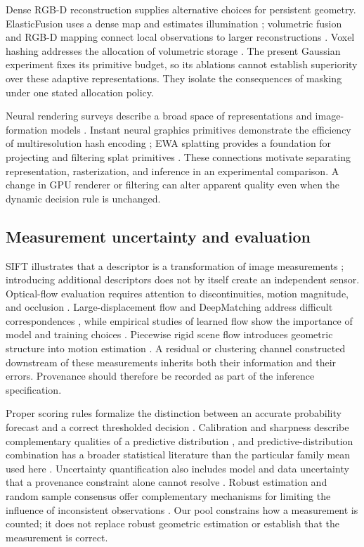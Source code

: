 \documentclass[10pt,conference]{IEEEtran}
\begin{document}
Dense RGB-D reconstruction supplies alternative choices for persistent geometry. ElasticFusion uses a dense map and estimates illumination \cite{elastic2016}; volumetric fusion and RGB-D mapping connect local observations to larger reconstructions \cite{dense2018,rgbd2013}. Voxel hashing addresses the allocation of volumetric storage \cite{sdf2013}. The present Gaussian experiment fixes its primitive budget, so its ablations cannot establish superiority over these adaptive representations. They isolate the consequences of masking under one stated allocation policy.

Neural rendering surveys describe a broad space of representations and image-formation models \cite{nerfsurvey2022,neuralrender2022}. Instant neural graphics primitives demonstrate the efficiency of multiresolution hash encoding \cite{instant2022}; EWA splatting provides a foundation for projecting and filtering splat primitives \cite{ewasplat2002}. These connections motivate separating representation, rasterization, and inference in an experimental comparison. A change in GPU renderer or filtering can alter apparent quality even when the dynamic decision rule is unchanged.

\subsection{Measurement uncertainty and evaluation}
SIFT illustrates that a descriptor is a transformation of image measurements \cite{sift2004}; introducing additional descriptors does not by itself create an independent sensor. Optical-flow evaluation requires attention to discontinuities, motion magnitude, and occlusion \cite{flow2014}. Large-displacement flow and DeepMatching address difficult correspondences \cite{flow2010,deepflow2015}, while empirical studies of learned flow show the importance of model and training choices \cite{pwc2020}. Piecewise rigid scene flow introduces geometric structure into motion estimation \cite{sceneflow2019}. A residual or clustering channel constructed downstream of these measurements inherits both their information and their errors. Provenance should therefore be recorded as part of the inference specification.

Proper scoring rules formalize the distinction between an accurate probability forecast and a correct thresholded decision \cite{proper2007journal}. Calibration and sharpness describe complementary qualities of a predictive distribution \cite{forecast2007journal}, and predictive-distribution combination has a broader statistical literature than the particular family mean used here \cite{pool2013}. Uncertainty quantification also includes model and data uncertainty that a provenance constraint alone cannot resolve \cite{uncertainty2021}. Robust estimation and random sample consensus offer complementary mechanisms for limiting the influence of inconsistent observations \cite{robust1964journal,ransac1981journal}. Our pool constrains how a measurement is counted; it does not replace robust geometric estimation or establish that the measurement is correct.
\end{document}
